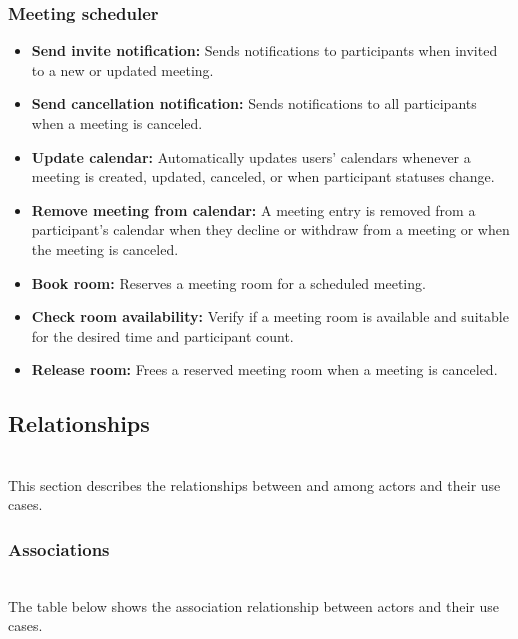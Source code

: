 \subsubsection{Meeting scheduler}\label{_7pl-PeJDGf9z0puKAg0x}

\begin{itemize}
\item
\protect{}\label{eNlDOYigga-pNepPra0ys}
\textbf{Send invite notification:} Sends notifications to participants when invited to a new or updated meeting.
\item
\protect{}\label{714ufQNyq6-RKXZnmgrym}
\textbf{Send cancellation notification:} Sends notifications to all participants when a meeting is canceled.
\item
\protect{}\label{mka7iMTKzwjhv-vWgemDV}
\textbf{Update calendar:} Automatically updates users' calendars whenever a meeting is created, updated, canceled, or when participant statuses change.
\item
\protect{}\label{L3AZaJWsHbbrdgk5dC0HX}
\textbf{Remove meeting from calendar:} A meeting entry is removed from a participant's calendar when they decline or withdraw from a meeting or when the meeting is canceled.
\item
\protect{}\label{WHRAUbOeIAApxqZi-6v9V}
\textbf{Book room:} Reserves a meeting room for a scheduled meeting.
\item
\protect{}\label{_3ZhsKAU6Fxl6dYM8Ca7q}
\textbf{Check room availability:} Verify if a meeting room is available and suitable for the desired time and participant count.
\item
\protect{}\label{qY-jRZ82ksIx798HwZ16X}
\textbf{Release room:} Frees a reserved meeting room when a meeting is canceled.
\end{itemize}

\subsection{Relationships}\label{GxbHka8cDwCLgPxUy01h5}
\\
This section describes the relationships between and among actors and their use cases.

\subsubsection{Associations}\label{DkU7xBwuzAyOwGbxDO5w3}
\\
The table below shows the association relationship between actors and their use cases.

